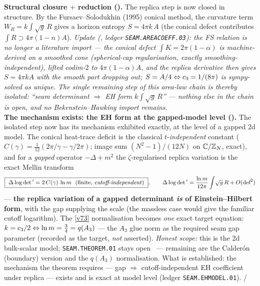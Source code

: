 \begin{gapbox}
\smallskip\noindent\textbf{Structural closure $+$ reduction ().} The
replica step is now closed in structure. By the Fursaev--Solodukhin (1995) conical method, the curvature
term $W_R=k\!\int\!\sqrt g\,R$ gives a horizon entropy $S=4\pi k\,A$ (the conical defect contributes
$\int R\supset4\pi(1{-}n)A$). \emph{Update (, ledger
\texttt{SEAM.AREACOEFF.03}): the FS relation is no longer a literature import --- the conical defect
$\int K=2\pi(1{-}\alpha)$ is machine-derived on a smoothed cone (spherical-cap regularisation, exactly
smoothing-independent), lifted codim-$2$ to $4\pi(1{-}\alpha)A$, and the replica derivative then gives
$S=4\pi kA$ with the smooth part dropping out; $S=A/4\Leftrightarrow c_3=1/(8\pi)$ is sympy-solved as
unique. The single remaining step of \emph{this area-law chain} is thereby isolated: ``seam determinant $\Rightarrow$
EH form $k\!\int\!\sqrt g\,R$'' --- nothing else in the chain is open, and no Bekenstein--Hawking import remains.}
\smallskip\\
\noindent\textbf{The mechanism exists: the EH form at the gapped-model level
().} The isolated step now has its mechanism exhibited exactly, at the
level of a gapped 2d model. The conical heat-trace deficit is the classical $t$-\emph{independent}
constant ($C(\gamma)=\tfrac1{12}(2\pi/\gamma-\gamma/2\pi)$; image sum $(N^2{-}1)/(12N)$ on
$\mathbb C/\mathbb Z_N$, exact), and for a \emph{gapped} operator $-\Delta+m^2$ the $\zeta$-regularised replica
variation is the exact Mellin transform
\[
  \boxed{\ \Delta\log\det{}'=2\,C(\gamma)\,\ln m\ \ \text{(finite, \emph{cutoff-independent})}\ },\qquad
  \Delta\log\det{}'=\frac{\ln m}{12\pi}\int\!\sqrt g\,R+O(\text{def}^2)
\]
--- \textbf{the replica variation of a gapped determinant \emph{is} of Einstein--Hilbert form}, with the
gap supplying the scale (the massless case would give the familiar cutoff logarithm). The \vref{v73}
normalisation becomes \emph{one} exact target equation: $k=c_3/2\Leftrightarrow\ln m=\tfrac34=q(A_3)$
--- the $A_3$ glue norm as the required seam gap parameter (recorded as the target, \emph{not} asserted).
\emph{Honest scope:} this is the 2d bulk-scalar model; \texttt{SEAM.THEOREM.01} stays open \mO\ ---
remaining are the Calder\'on (boundary) version and the $q(A_3)$ normalisation. What is established: the
mechanism the theorem requires --- gap $\Rightarrow$ cutoff-independent EH coefficient under replica ---
exists and is exact at model level (ledger \texttt{SEAM.EHMODEL.01}). \mE/\mO

\end{gapbox}
